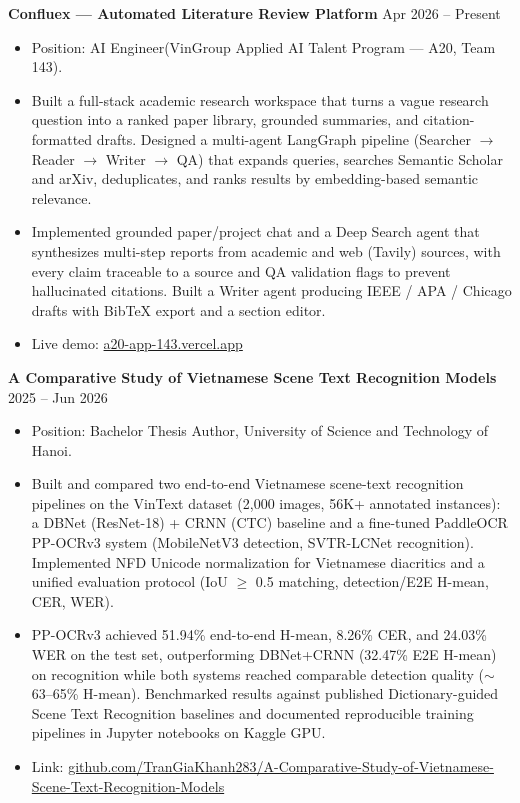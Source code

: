 \documentclass[11pt,a4paper]{article}
\begin{document}
\textbf{Confluex — Automated Literature Review Platform} \hfill Apr 2026 -- Present
\begin{itemize}[leftmargin=1.5em]
    \item Position: AI Engineer(VinGroup Applied AI Talent Program — A20, Team 143).
    \item Built a full-stack academic research workspace that turns a vague research question into a ranked paper library, grounded summaries, and citation-formatted drafts. Designed a multi-agent LangGraph pipeline (Searcher $\rightarrow$ Reader $\rightarrow$ Writer $\rightarrow$ QA) that expands queries, searches Semantic Scholar and arXiv, deduplicates, and ranks results by embedding-based semantic relevance.
    \item Implemented grounded paper/project chat and a Deep Search agent that synthesizes multi-step reports from academic and web (Tavily) sources, with every claim traceable to a source and QA validation flags to prevent hallucinated citations. Built a Writer agent producing IEEE / APA / Chicago drafts with BibTeX export and a section editor.
    \item Live demo: \href{https://a20-app-143.vercel.app}{a20-app-143.vercel.app}
\end{itemize}

\textbf{A Comparative Study of Vietnamese Scene Text Recognition Models} \hfill 2025 -- Jun 2026
\begin{itemize}[leftmargin=1.5em]
    \item Position: Bachelor Thesis Author, University of Science and Technology of Hanoi.
    \item Built and compared two end-to-end Vietnamese scene-text recognition pipelines on the VinText dataset (2{,}000 images, 56K+ annotated instances): a DBNet (ResNet-18) + CRNN (CTC) baseline and a fine-tuned PaddleOCR PP-OCRv3 system (MobileNetV3 detection, SVTR-LCNet recognition). Implemented NFD Unicode normalization for Vietnamese diacritics and a unified evaluation protocol (IoU $\geq$ 0.5 matching, detection/E2E H-mean, CER, WER).
    \item PP-OCRv3 achieved 51.94\% end-to-end H-mean, 8.26\% CER, and 24.03\% WER on the test set, outperforming DBNet+CRNN (32.47\% E2E H-mean) on recognition while both systems reached comparable detection quality ($\sim$63--65\% H-mean). Benchmarked results against published Dictionary-guided Scene Text Recognition baselines and documented reproducible training pipelines in Jupyter notebooks on Kaggle GPU.
    \item Link: \href{https://github.com/TranGiaKhanh283/A-Comparative-Study-of-Vietnamese-Scene-Text-Recognition-Models}{github.com/TranGiaKhanh283/A-Comparative-Study-of-Vietnamese-Scene-Text-Recognition-Models}
\end{itemize}
\end{document}
